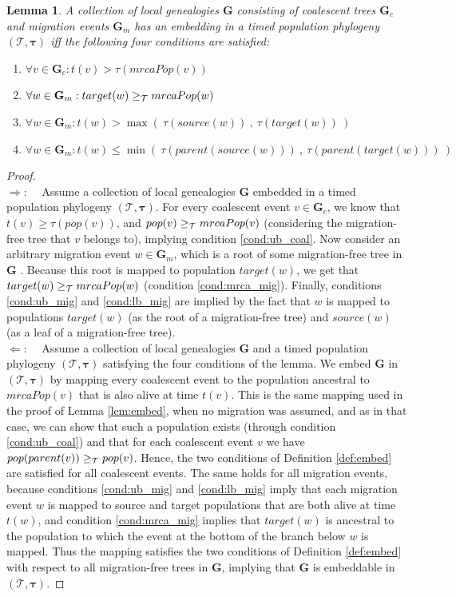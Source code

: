 \documentclass[11pt]{article}
\newcommand{\vect}[1]{\boldsymbol{\mathbf{#1}}}
\newcommand{\Tr}{\mathcal{T}}
\newcommand{\G}{\vect{G}}
\newcommand{\1}{\mathbbm{1}}
\newcommand{\Gc}{\G_c}
\newcommand{\Gm}{\G_m}
\newtheorem{lemma}{Lemma}
\newcommand{\taus}{\vect\tau}
\begin{document}
\begin{lemma}\label{lem:embed_mig}
 A collection of local genealogies $\G$  consisting of coalescent trees $\Gc$ and migration events $\Gm$ has an embedding in a timed population phylogeny $(\Tr,\taus)$ iff
 the following four conditions are satisfied:
 \begin{enumerate}
  \item \label{cond:ub_coal}  $\forall v\in \Gc: t(v) > \tau(mrcaPop(v))$
  \item \label{cond:mrca_mig} $\forall w\in\Gm: target(w)\anc mrcaPop(w)$
  \item \label{cond:ub_mig}   $\forall w\in\Gm: t(w) > \max(~\tau(source(w))~,~\tau(target(w))~)$
  \item \label{cond:lb_mig}   $\forall w\in\Gm: t(w) \leq \min(~\tau(parent(source(w)))~,~\tau(parent(target(w)))~)$
 \end{enumerate}
\end{lemma}

\begin{proof}
~\\
 $\Rightarrow$:~~ Assume a collection of local genealogies $\G$ embedded in a timed population phylogeny $(\Tr,\taus)$. For every coalescent event $v\in\Gc$, we know that
 $t(v)\geq \tau(pop(v))$, and $pop(v)\anc mrcaPop(v)$ (considering the migration-free tree that $v$ belongs to), implying condition \ref{cond:ub_coal}.
 Now consider an arbitrary migration event $w\in\Gm$, which is a root of some migration-free tree in $\G$ . Because this root is mapped to population $target(w)$, we get that
 $target(w)\anc  mrcaPop(w)$ (condition \ref{cond:mrca_mig}).
 Finally, conditions \ref{cond:ub_mig} and \ref{cond:lb_mig} are implied by the fact that $w$ is mapped to populations $target(w)$ (as the root of a migration-free tree) and
 $source(w)$ (as a leaf of a migration-free tree).\\
 $\Leftarrow$:~~ Assume a collection of local genealogies $\G$ and a timed population phylogeny $(\Tr,\taus)$ satisfying the four conditions of the lemma.
 We embed $\G$ in $(\Tr,\taus)$ by mapping every coalescent event to the population ancestral to $mrcaPop(v)$ that is also alive at time $t(v)$.
 This is the same mapping used in the proof of Lemma \ref{lem:embed}, when no migration was assumed, and as in that case,
 we can show that such a population exists (through condition \ref{cond:ub_coal}) and that for each coalescent event $v$  we have $pop(parent(v))\anc pop(v)$.
 Hence, the two conditions of Definition \ref{def:embed} are satisfied for all coalescent events.
 The same holds for all migration events, because
 conditions \ref{cond:ub_mig} and \ref{cond:lb_mig} imply that each migration event $w$ is mapped to source and target populations that are both alive at time $t(w)$,
 and condition \ref{cond:mrca_mig} implies that $target(w)$ is ancestral to the population to which the event at the bottom of the branch below $w$ is mapped.
 Thus the mapping satisfies the two conditions of Definition \ref{def:embed} with respect to all migration-free trees in $\G$, implying that $\G$ is embeddable
 in $(\Tr,\taus)$.
\end{proof}
\end{document}
